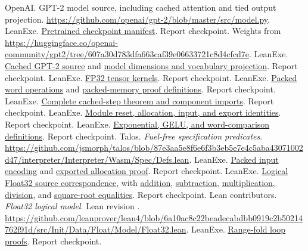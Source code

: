 \documentclass[11pt]{article}
\newcommand{\longcode}[1]{\texttt{\seqsplit{#1}}}
\newcommand{\src}[2]{\href{https://github.com/jsmorph/leanexe/blob/4360920c3060d1c625b1860229b5116804d177c8/#1}{#2}}
\begin{document}
\begin{thebibliography}{99}
 OpenAI.  GPT-2 model source, including cached attention and tied output projection.  \url{https://github.com/openai/gpt-2/blob/master/src/model.py}.
 LeanExe.  \src{data/gpt2-124m/manifest.json}{Pretrained checkpoint manifest}.  Report checkpoint.  Weights from \url{https://huggingface.co/openai-community/gpt2/tree/607a30d783dfa663caf39e06633721c8d4cfcd7e}.
 LeanExe.  \src{LeanExe/Models/Gpt2/Cached.lean}{Cached GPT-2 source} and \src{LeanExe/Models/Gpt2/Inference.lean}{model dimensions and vocabulary projection}.  Report checkpoint.
 LeanExe.  \src{LeanExe/Models/Gpt2/Kernel.lean}{FP32 tensor kernels}.  Report checkpoint.
 LeanExe.  \src{LeanExe/Packed.lean}{Packed word operations} and \src{proofs/talos/lean/Project/ProofKit/PackedMemory.lean}{packed-memory proof definitions}.  Report checkpoint.
 LeanExe.  \src{proofs/talos/lean/Project/Gpt2CachedStep/Spec.lean}{Complete cached-step theorem and component imports}.  Report checkpoint.
 LeanExe.  \src{proofs/talos/lean/Project/Gpt2CachedStep/Initialize.lean}{Module reset, allocation, input, and export identities}.  Report checkpoint.
 LeanExe.  \src{LeanExe/Models/Gpt2/Numerics.lean}{Exponential, GELU, and word-comparison definitions}.  Report checkpoint.
 Talos.  \emph{Fuel-free specification predicates}.  \url{https://github.com/jsmorph/talos/blob/87e3aa5e8f6e6f3b3eb5e7e4c5aba43071002d47/interpreter/Interpreter/Wasm/Spec/Defs.lean}.
 LeanExe.  \src{proofs/talos/lean/Project/ProofKit/PackedInput.lean}{Packed input encoding} and \src{proofs/talos/lean/Project/ProofKit/PackedAllocExport.lean}{exported allocation proof}.  Report checkpoint.
 LeanExe.  \src{proofs/talos/lean/Project/ProofKit/F32Source.lean}{Logical Float32 source correspondence}, with \src{proofs/talos/lean/Project/ProofKit/F32Add.lean}{addition}, \src{proofs/talos/lean/Project/ProofKit/F32Sub.lean}{subtraction}, \src{proofs/talos/lean/Project/ProofKit/F32Mul.lean}{multiplication}, \src{proofs/talos/lean/Project/ProofKit/F32Div.lean}{division}, and \src{proofs/talos/lean/Project/ProofKit/F32Sqrt.lean}{square-root equalities}.  Report checkpoint.
 Lean contributors.  \emph{Float32 logical model}.  Lean revision \longcode{6a10ac8c22beadecabdbb0919c2b50214762f91d}.  \url{https://github.com/leanprover/lean4/blob/6a10ac8c22beadecabdbb0919c2b50214762f91d/src/Init/Data/Float/Model/Float32.lean}.
 LeanExe.  \src{proofs/talos/lean/Project/ProofKit/RangeFoldLoop.lean}{Range-fold loop proofs}.  Report checkpoint.

\end{thebibliography}
\end{document}

